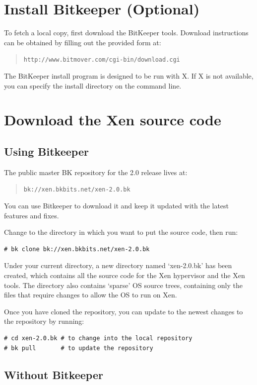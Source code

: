 \documentclass[11pt,twoside,final,openright]{xenstyle}
\begin{document}
\section{Install Bitkeeper (Optional)}

To fetch a local copy, first download the BitKeeper tools.
Download instructions can be obtained by filling out the provided
form at: 
\begin{quote} 
{\tt http://www.bitmover.com/cgi-bin/download.cgi}
\end{quote}

The BitKeeper install program is designed to be run with X.  If X is
not available, you can specify the install directory on the command
line.

\section{Download the Xen source code}

\subsection{Using Bitkeeper}

The public master BK repository for the 2.0 release lives at: 
\begin{quote}
{\tt bk://xen.bkbits.net/xen-2.0.bk}  
\end{quote} 
You can use Bitkeeper to
download it and keep it updated with the latest features and fixes.

Change to the directory in which you want to put the source code, then
run:
\begin{verbatim}
# bk clone bk://xen.bkbits.net/xen-2.0.bk
\end{verbatim}


Under your current directory, a new directory named `xen-2.0.bk' has
been created, which contains all the source code for the Xen
hypervisor and the Xen tools.  The directory also contains `sparse' OS
source trees, containing only the files that require changes to allow
the OS to run on Xen.

Once you have cloned the repository, you can update to the newest
changes to the repository by running:
\begin{verbatim}
# cd xen-2.0.bk # to change into the local repository
# bk pull       # to update the repository
\end{verbatim}

\subsection{Without Bitkeeper}
\end{document}

